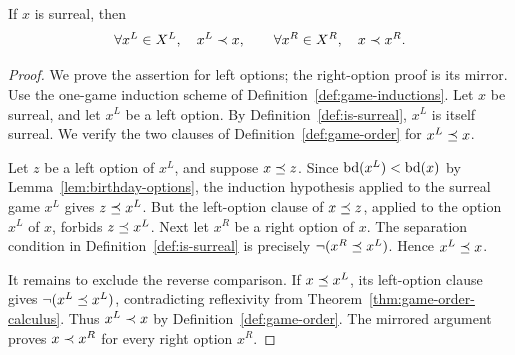 \begin{theorem}
  \label{thm:between-options}
  \leanok
  If \(x\) is surreal, then
  \[
    \forall x^L\in X^L,\quad x^L\prec x,
    \qquad
    \forall x^R\in X^R,\quad x\prec x^R.
  \]
\end{theorem}
\begin{proof}
  \leanok
  We prove the assertion for left options; the right-option proof is its
  mirror.  Use the one-game induction scheme of
  Definition~\ref{def:game-inductions}.  Let \(x\) be surreal, and let
  \(x^L\) be a left option.  By Definition~\ref{def:is-surreal}, \(x^L\) is
  itself surreal.  We verify the two clauses of
  Definition~\ref{def:game-order} for \(x^L\preceq x\).

  Let \(z\) be a left option of \(x^L\), and suppose \(x\preceq z\).  Since
  \(\operatorname{bd}(x^L)<\operatorname{bd}(x)\) by Lemma~\ref{lem:birthday-options}, the induction
  hypothesis applied to the surreal game \(x^L\) gives \(z\preceq x^L\).
  But the left-option clause of \(x\preceq z\), applied to the option \(x^L\)
  of \(x\), forbids \(z\preceq x^L\).  Next let \(x^R\) be a right option of
  \(x\).  The separation condition in Definition~\ref{def:is-surreal} is
  precisely \(\neg(x^R\preceq x^L)\).  Hence \(x^L\preceq x\).

  It remains to exclude the reverse comparison.  If \(x\preceq x^L\), its
  left-option clause gives \(\neg(x^L\preceq x^L)\), contradicting
  reflexivity from Theorem~\ref{thm:game-order-calculus}.  Thus
  \(x^L\prec x\) by Definition~\ref{def:game-order}.  The mirrored argument
  proves \(x\prec x^R\) for every right option \(x^R\).
\end{proof}

